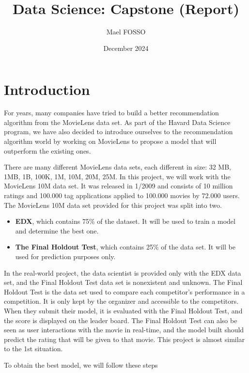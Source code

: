 \documentclass[
]{article}
\title{Data Science: Capstone (Report)}
\author{Mael FOSSO}
\date{December 2024}
\providecommand{\tightlist}{%
  \setlength{\itemsep}{0pt}\setlength{\parskip}{0pt}}
\begin{document}
\maketitle

\section{Introduction}\label{introduction}

For years, many companies have tried to build a better recommendation
algorithm from the MovieLens data set. As part of the Havard Data
Science program, we have also decided to introduce ourselves to the
recommendation algorithm world by working on MovieLens to propose a
model that will outperform the existing ones.

There are many different MovieLens data sets, each different in size: 32
MB, 1MB, 1B, 100K, 1M, 10M, 20M, 25M. In this project, we will work with
the MovieLens 10M data set. It was released in 1/2009 and consists of 10
million ratings and 100.000 tag applications applied to 100.000 movies
by 72.000 users. The MovieLens 10M data set provided for this project
was split into two.

\begin{itemize}
\tightlist
\item
  \textbf{EDX}, which contains 75\% of the dataset. It will be used to
  train a model and determine the best one.
\item
  \textbf{The Final Holdout Test}, which contains 25\% of the data set.
  It will be used for prediction purposes only.
\end{itemize}

In the real-world project, the data scientist is provided only with the
EDX data set, and the Final Holdout Test data set is nonexistent and
unknown. The Final Holdout Test is the data set used to compare each
competitor's performance in a competition. It is only kept by the
organizer and accessible to the competitors. When they submit their
model, it is evaluated with the Final Holdout Test, and the score is
displayed on the leader board. The Final Holdout Test can also be seen
as user interactions with the movie in real-time, and the model built
should predict the rating that will be given to that movie. This project
is almost similar to the 1st situation.

To obtain the best model, we will follow these steps
\end{document}
